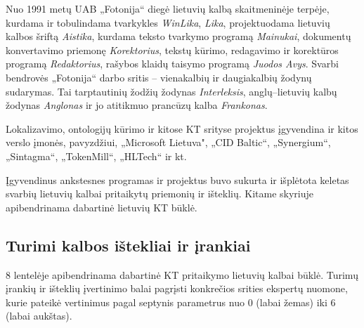 \documentclass[]{../metanetpaper}
\begin{document}
\begin{multicols}{2}
    Nuo 1991 metų UAB „Fotonija“ diegė lietuvių kalbą skaitmeninėje terpėje, kurdama ir tobulindama tvarkykles \textit{WinLika}, \textit{Lika}, projektuodama lietuvių kalbos šriftą \textit{Aistika}, kurdama teksto tvarkymo programą \textit{Mainukai}, dokumentų konvertavimo priemonę \textit{Korektorius}, tekstų kūrimo, redagavimo ir korektūros programą \textit{Redaktorius}, rašybos klaidų taisymo programą \textit{Juodos Avys}. Svarbi bendrovės „Fotonija“ darbo sritis – vienakalbių ir daugiakalbių žodynų sudarymas. Tai tarptautinių žodžių žodynas \textit{Interleksis}, anglų–lietuvių kalbų žodynas \textit{Anglonas} ir jo atitikmuo prancūzų kalba \textit{Frankonas}.   

Lokalizavimo, ontologijų kūrimo ir kitose KT srityse projektus įgyvendina ir kitos verslo įmonės, pavyzdžiui, „Microsoft Lietuva", „CID Baltic“, „Synergium“, „Sintagma“, „TokenMill“, „HLTech“ ir kt. 

Įgyvendinus ankstesnes programas ir projektus buvo sukurta ir išplėtota keletas svarbių lietuvių kalbai pritaikytų priemonių ir išteklių. Kitame skyriuje apibendrinama dabartinė lietuvių KT būklė.

\subsection{Turimi kalbos ištekliai ir įrankiai}

8 lentelėje apibendrinama dabartinė KT pritaikymo lietuvių kalbai būklė. Turimų įrankių ir išteklių įvertinimo balai pagrįsti  konkrečios srities ekspertų nuomone,  kurie pateikė vertinimus pagal septynis parametrus nuo 0 (labai žemas) iki 6 (labai aukštas).


\end{multicols}
\end{document}
